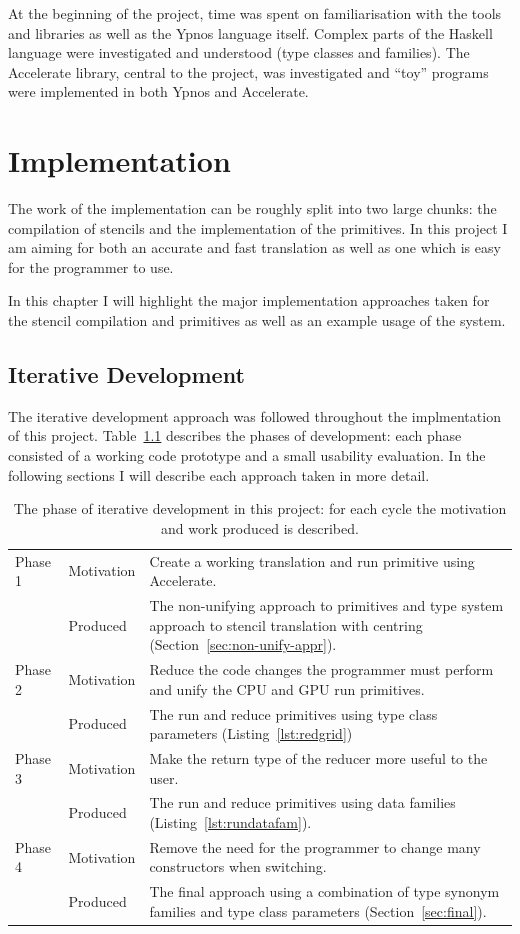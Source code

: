 \documentclass[
    12pt,
    a4paper,
    twoside,
    openright,
    ]{scrbook}
\begin{document}
At the beginning of the project, time was spent on familiarisation with the
tools and libraries as well as the Ypnos language itself. Complex parts of the
Haskell language were investigated and understood (type classes and
families). The Accelerate library, central to the project, was investigated and
``toy'' programs were implemented in both Ypnos and Accelerate.

\chapter{Implementation}
\label{chap:impl}

The work of the implementation can be roughly split into two large chunks: the
compilation of stencils and the implementation of the primitives. In this
project I am aiming for both an accurate and fast translation as well as one
which is easy for the programmer to use.

In this chapter I will highlight the major implementation approaches taken for
the stencil compilation and primitives as well as an example usage of the
system.

\section{Iterative Development}

The iterative development approach was followed throughout the implmentation of
this project. Table~\ref{tbl:iter} describes the phases of development: each
phase consisted of a working code prototype and a small usability evaluation. In
the following sections I will describe each approach taken in more detail.

\begin{table}
\begin{tabular}{l l | p{10cm}}
  Phase 1 & Motivation & Create a working translation and run primitive using Accelerate.\\
  & Produced & The non-unifying approach to primitives and type system approach to stencil translation with centring (Section~\ref{sec:non-unify-appr}).
  \\
  Phase 2 & Motivation & Reduce the code changes the programmer must perform and unify the CPU and GPU run primitives.\\
  & Produced & The run and reduce primitives using type class parameters (Listing~\ref{lst:redgrid})
  \\
  Phase 3 & Motivation & Make the return type of the reducer more useful to the user.\\
  & Produced & The run and reduce primitives using data families (Listing~\ref{lst:rundatafam}).
  \\
  Phase 4 & Motivation & Remove the need for the programmer to change many constructors when switching.\\
  & Produced & The final approach using a combination of type synonym families and type class parameters (Section~\ref{sec:final}).
\end{tabular}
\caption{The phase of iterative development in this project: for each cycle the motivation and work produced is described. \label{tbl:iter}}
\end{table}
\end{document}
